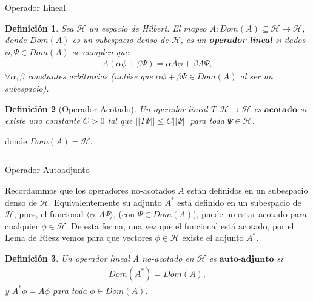 \documentclass[aspectratio=1610]{beamer}
\newtheorem*{defn}{Definición}
\begin{document}
\begin{frame}{Operador Lineal}

\begin{defn}
    Sea $\mathcal{H}$ un espacio de Hilbert. El mapeo $A:Dom(A)\subseteq\mathcal{H}\longrightarrow\mathcal{H}$, donde $Dom(A)$ es un subespacio denso de $\mathcal{H}$, es un \textbf{operador lineal} si dados $\phi,\Psi \in Dom(A)$ se cumplen que
    \begin{align*}
        A(\alpha\phi + \beta\Psi) = \alpha A\phi + \beta A \Psi,
    \end{align*}
    $\forall \alpha, \beta$ constantes arbitrarias (notése que $\alpha\phi + \beta\Psi \in Dom(A)$ al ser un subespacio).
\end{defn}

\begin{defn}[Operador Acotado]
    Un operador lineal\: $T:\mathcal{H} \longrightarrow \mathcal{H}$ es $\textbf{acotado}$ si existe una constante $C > 0$ tal que $||T\Psi|| \leq C||\Psi||$ para toda $\Psi \in \mathcal{H}$.
    \label{def:opeAcot}
\end{defn}
donde $Dom(A) = \mathcal{H}$.
   
\begin{columns}
\column{37em}
\end{columns}
\end{frame}



\begin{frame}{Operador Autoadjunto}

Recordammos que los operadores no-acotados $A$ están definidos en un subespacio denso de $\mathcal{H}$. Equivalentemente su adjunto $A^*$ está definido en un subespacio de $\mathcal{H}$, pues, el funcional $\langle\phi,A\Psi\rangle$, (con $\Psi\in Dom(A)$), puede no estar acotado para cualquier $\phi\in\mathcal{H}$. De esta forma, una vez que el funcional está acotado, por el Lema de Riesz vemos para que vectores $\phi\in\mathcal{H}$ existe el adjunto $A^*$.


\begin{defn}
    Un operador lineal A no-acotado en  $\mathcal{H}$ es $\textbf{auto-adjunto}$ si
    \begin{align}
        Dom(A^{*}) = Dom(A),
    \end{align}
    y $A^{*}\phi = A\phi$ para toda $\phi \in Dom(A)$.
    \label{def:Autoadjunto}
\end{defn}

\vspace{0.05\textheight}

\begin{columns}
\column{37em}
\end{columns}
\end{frame}
\end{document}
